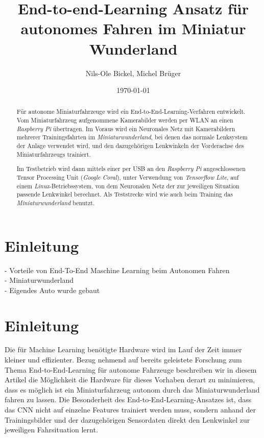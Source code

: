 \documentclass[a4paper, 12pt]{scrartcl}
\title{End-to-end-Learning Ansatz für autonomes Fahren im Miniatur Wunderland}
\author{Nils-Ole Bickel, Michel Brüger}
\date{\today}
\begin{document}
	
\maketitle



\begin{abstract}	
Für autonome Miniaturfahrzeuge wird ein End-to-End-Learning-Verfahren entwickelt. Vom Miniaturfahrzeug aufgenommene Kamerabilder werden per WLAN an einen \emph{Raspberry Pi} übertragen. Im Voraus wird ein Neuronales Netz mit Kamerabildern mehrerer Trainingsfahrten im \emph{Miniaturwunderland}, bei denen das normale Lenksystem der Anlage verwendet wird, und den dazugehörigen Lenkwinkeln der Vorderachse des Miniaturfahrzeugs trainiert. 

Im Testbetrieb wird dann mittels einer per USB an den \emph{Raspberry Pi} angeschlossenen Tensor Processing Unit (\emph{Google Coral}), unter Verwendung von \emph{Tensorflow Lite}, auf einem \emph{Linux}-Betriebssystem, von dem Neuronalen Netz der zur jeweiligen Situation passende Lenkwinkel berechnet.
Als Teststrecke wird wie auch beim Training das \emph{Miniaturwunderland} benutzt.
\end{abstract}

\newpage	


\newpage
	\section{Einleitung}
	- Vorteile von End-To-End Maschine Learning beim Autonomen Fahren \\
	- Miniaturwunderland \\
	- Eigendes Auto wurde gebaut

	\section{Einleitung}
	Die für Machine Learning benötigte Hardware wird im Lauf der Zeit immer kleiner und effizienter. Bezug nehmend auf bereits geleistete Forschung zum Thema End-to-End-Learning für autonome Fahrzeuge \cite{article} beschreiben wir in diesem Artikel die Möglichkeit die Hardware für dieses Vorhaben derart zu minimieren, dass es möglich ist ein Miniaturfahrzeug autonom durch das Miniaturwunderland fahren zu lassen. Die Besonderheit des End-to-End-Learning-Ansatzes ist, dass das CNN nicht auf einzelne Features trainiert werden muss, sondern anhand der Trainingsbilder und der dazugehörigen Sensordaten direkt den Lenkwinkel zur jeweiligen Fahrsituation lernt. 
\end{document}
